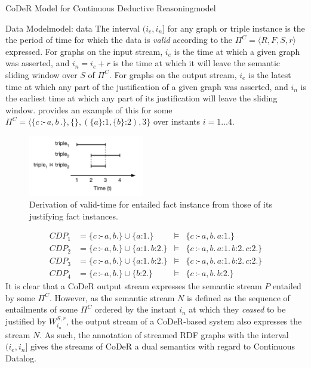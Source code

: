 \begin{nestedsection}{CoDeR Model for Continuous Deductive Reasoning}{model}
\begin{nestedsection}{Data Model}{model: data}
		The interval ${(i_e,i_n]}$ for any graph or triple instance is the the period of time for which the data is \emph{valid} \citep{SemanticStreamingManagement,sparkwave} according to the ${\Pi^C = \langle R, F, S, r \rangle}$ expressed.
		For graphs on the input stream, $i_e$ is the time at which a given graph was asserted, and ${i_n = i_e + r}$ is the time at which it will leave the semantic sliding window over $S$ of $\Pi^C$.
		For graphs on the output stream, $i_e$ is the latest time at which any part of the justification of a given graph was asserted, and $i_n$ is the earliest time at which any part of its justification will leave the sliding window.
		 provides an example of this for some ${\Pi^C = \langle \{c\,\text{:-}\,a,b\,.\},\{\},(\{a\}\text{:}1,\{b\}\text{:}2),3\}}$ over instants ${i = 1 \dots 4}$.
		\begin{figure}
			\centering
			\includegraphics[width=0.45\textwidth]{intersected-intervals}
			\caption{Derivation of valid-time for entailed fact instance from those of its justifying fact instances.}
		\end{figure}
		\begin{align*}
			CDP_{1} & = \{c\,\text{:-}\,a,b.\} \cup \{ a\text{:}1. \} & \vDash & \{ c\,\text{:-}\,a,b. \, a\text{:}1. \} \\
			CDP_{2} & = \{c\,\text{:-}\,a,b.\} \cup \{ a\text{:}1. \, b\text{:}2. \} & \vDash & \{ c\,\text{:-}\,a,b. \, a\text{:}1. \, b\text{:}2. \, c\text{:}2. \} \\
			CDP_{3} & = \{c\,\text{:-}\,a,b.\} \cup \{ a\text{:}1. \, b\text{:}2. \} & \vDash & \{ c\,\text{:-}\,a,b. \, a\text{:}1. \, b\text{:}2. \, c\text{:}2. \} \\
			CDP_{4} & = \{c\,\text{:-}\,a,b.\} \cup \{ b\text{:}2. \} & \vDash & \{ c\,\text{:-}\,a,b. \, b\text{:}2. \}
		\end{align*}
		It is clear that a CoDeR output stream expresses the semantic stream $P$ entailed by some $\Pi^C$.
		However, as the semantic stream $N$ is defined as the sequence of entailments of some $\Pi^C$ ordered by the instant $i_{n}$ at which they \emph{ceased} to be justified by $W^{S,r}_{i_n}$, the output stream of a CoDeR-based system also expresses the stream $N$.
		As such, the annotation of streamed RDF graphs with the interval $(i_e,i_n]$ gives the streams of CoDeR a dual semantics with regard to Continuous Datalog.


\end{nestedsection}
\end{nestedsection}
